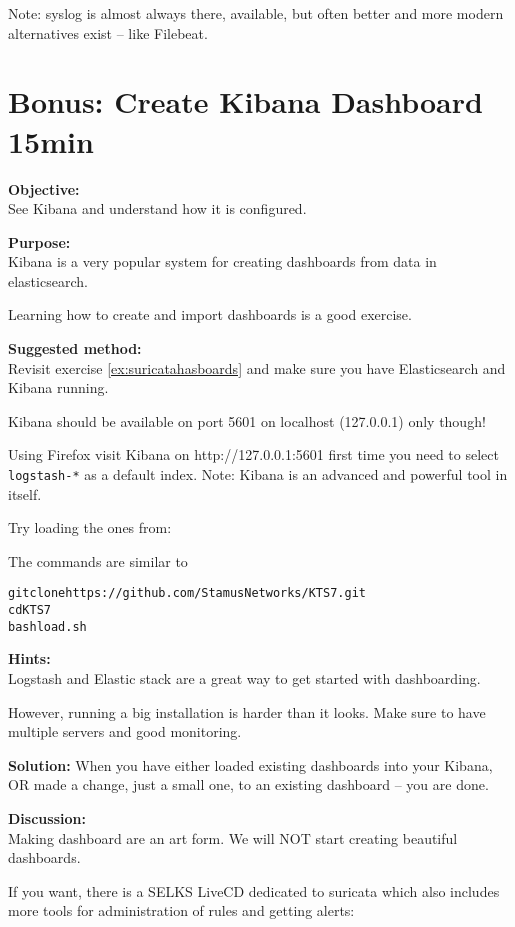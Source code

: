 \documentclass[a4paper,11pt,notitlepage]{report}
\begin{document}
Note: syslog is almost always there, available, but often better and more modern alternatives exist -- like Filebeat.


\chapter{Bonus: Create Kibana Dashboard 15min}
\label{ex:kibana-dashboard}

{\bf Objective:}\\
See Kibana and understand how it is configured.

{\bf Purpose:}\\
Kibana is a very popular system for creating dashboards from data in elasticsearch.

Learning how to create and import dashboards is a good exercise.

{\bf Suggested method:}\\
Revisit exercise \ref{ex:suricatahasboards} and make sure you have Elasticsearch and Kibana running.

Kibana should be available on port 5601 on localhost (127.0.0.1) only though!

Using Firefox visit Kibana on http://127.0.0.1:5601 first time you need to
 select \verb+logstash-*+ as a default index. Note: Kibana is an advanced and powerful tool in itself.

Try loading the ones from:

The commands are similar to
\begin{alltt}
git clone https://github.com/StamusNetworks/KTS7.git
cd KTS7
bash load.sh
\end{alltt}

{\bf Hints:}\\
Logstash and Elastic stack are a great way to get started with dashboarding.

However, running a big installation is harder than it looks. Make sure to have multiple servers and good monitoring.

{\bf Solution:}
When you have either loaded existing dashboards into your Kibana, OR made a change, just a small one, to an existing dashboard -- you are done.

{\bf Discussion:}\\
Making dashboard are an art form. We will NOT start creating beautiful dashboards.

If you want, there is a SELKS LiveCD dedicated to suricata which also includes more tools for administration of rules and getting alerts:\\
\end{document}
